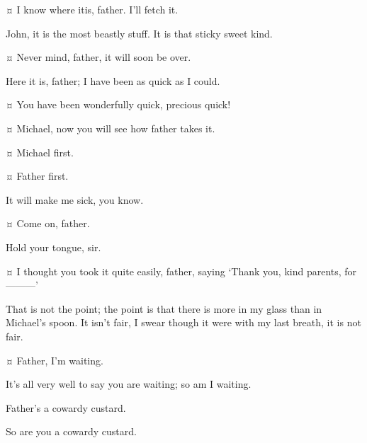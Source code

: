 \begin{drama}
\wendyspeaks {}¤
I know where itis, father.
I’ll fetch it.


\mrdarlingspeaks
John, it is the most beastly stuff.
It is that sticky sweet kind.

\johnspeaks {}¤
Never mind, father, it will soon be over.


\wendyspeaks
Here it is, father; I have been as quick as I could.

\mrdarlingspeaks {}¤
You have been wonderfully quick, precious quick!


\wendyspeaks {}¤
Michael, now you will see how father takes it.

\mrdarlingspeaks {}¤
Michael first.

\michaelspeaks {}¤
Father first.

\mrdarlingspeaks
It will make me sick, you know.

\johnspeaks {}¤
Come on, father.

\mrdarlingspeaks
Hold your tongue, sir.

\wendyspeaks {}¤
I thought you took it quite easily, father, saying ‘Thank you, kind parents, for———’

\mrdarlingspeaks
That is not the point; the point is that there is more in my glass than in Michael’s spoon.
It isn’t fair, I swear though it were with my last breath, it is not fair.

\michaelspeaks {}¤
Father, I’m waiting.

\mrdarlingspeaks
It’s all very well to say you are waiting; so am I waiting.

\michaelspeaks
Father’s a cowardy custard.

\mrdarlingspeaks
So are you a cowardy custard.



\end{drama}
